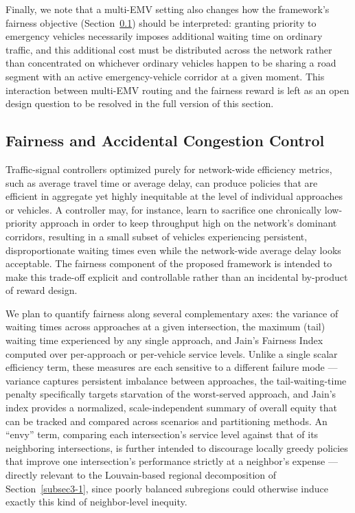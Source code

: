 \documentclass[3p,times]{elsarticle}
\theoremstyle{plain}
\theoremstyle{definition}
\begin{document}
Finally, we note that a multi-EMV setting also changes how the
framework's fairness objective (Section~\ref{subsec3-3}) should be
interpreted: granting priority to emergency vehicles necessarily
imposes additional waiting time on ordinary traffic, and this
additional cost must be distributed across the network rather than
concentrated on whichever ordinary vehicles happen to be sharing a
road segment with an active emergency-vehicle corridor at a given
moment. This interaction between multi-EMV routing and the fairness
reward is left as an open design question to be resolved in the full
version of this section.


\subsection{Fairness and Accidental Congestion Control}\label{subsec3-3}

Traffic-signal controllers optimized purely for network-wide
efficiency metrics, such as average travel time or average delay, can
produce policies that are efficient in aggregate yet highly inequitable
at the level of individual approaches or vehicles. A controller may,
for instance, learn to sacrifice one chronically low-priority approach
in order to keep throughput high on the network's dominant corridors,
resulting in a small subset of vehicles experiencing persistent,
disproportionate waiting times even while the network-wide average
delay looks acceptable. The fairness component of the proposed
framework is intended to make this trade-off explicit and controllable
rather than an incidental by-product of reward design.

We plan to quantify fairness along several complementary axes: the
variance of waiting times across approaches at a given intersection,
the maximum (tail) waiting time experienced by any single approach,
and Jain's Fairness Index computed over per-approach or per-vehicle
service levels. Unlike a single scalar efficiency term, these measures
are each sensitive to a different failure mode --- variance captures
persistent imbalance between approaches, the tail-waiting-time penalty
specifically targets starvation of the worst-served approach, and
Jain's index provides a normalized, scale-independent summary of
overall equity that can be tracked and compared across scenarios and
partitioning methods. An ``envy'' term, comparing each intersection's
service level against that of its neighboring intersections, is
further intended to discourage locally greedy policies that improve
one intersection's performance strictly at a neighbor's expense ---
directly relevant to the Louvain-based regional decomposition of
Section~\ref{subsec3-1}, since poorly balanced subregions could
otherwise induce exactly this kind of neighbor-level inequity.
\end{document}
